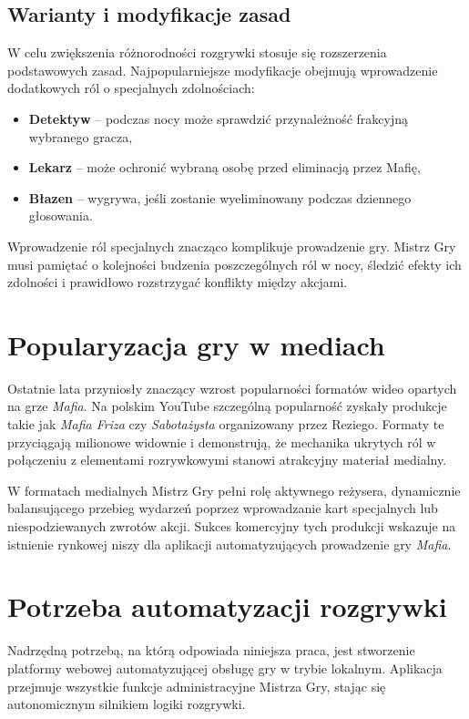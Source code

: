 ﻿\documentclass[a4paper,twoside,11pt]{mwrep}
\theoremstyle{plain} \newtheorem{thm}{Twierdzenie}
\theoremstyle{plain} \newtheorem{lem}{Lemat}
\theoremstyle{definition} \newtheorem{defn}{Definicja}
\theoremstyle{remark} \newtheorem*{rem}{Wniosek}
\begin{document}
\subsection{Warianty i modyfikacje zasad}

W celu zwiększenia różnorodności rozgrywki stosuje się rozszerzenia podstawowych zasad. Najpopularniejsze modyfikacje obejmują wprowadzenie dodatkowych ról o specjalnych zdolnościach:

\begin{itemize}
    \item \textbf{Detektyw} -- podczas nocy może sprawdzić przynależność frakcyjną wybranego gracza,
    \item \textbf{Lekarz} -- może ochronić wybraną osobę przed eliminacją przez Mafię,
    \item \textbf{Błazen} -- wygrywa, jeśli zostanie wyeliminowany podczas dziennego głosowania.
\end{itemize}

Wprowadzenie ról specjalnych znacząco komplikuje prowadzenie gry. Mistrz Gry musi pamiętać o kolejności budzenia poszczególnych ról w nocy, śledzić efekty ich zdolności i prawidłowo rozstrzygać konflikty między akcjami.

\section{Popularyzacja gry w mediach}

Ostatnie lata przyniosły znaczący wzrost popularności formatów wideo opartych na grze \textit{Mafia}. Na polskim YouTube szczególną popularność zyskały produkcje takie jak \textit{Mafia Friza} czy \textit{Sabotażysta} organizowany przez Reziego. Formaty te przyciągają milionowe widownie i demonstrują, że mechanika ukrytych ról w połączeniu z elementami rozrywkowymi stanowi atrakcyjny materiał medialny.

W formatach medialnych Mistrz Gry pełni rolę aktywnego reżysera, dynamicznie balansującego przebieg wydarzeń poprzez wprowadzanie kart specjalnych lub niespodziewanych zwrotów akcji. Sukces komercyjny tych produkcji wskazuje na istnienie rynkowej niszy dla aplikacji automatyzujących prowadzenie gry \textit{Mafia}.
\section{Potrzeba automatyzacji rozgrywki}

Nadrzędną potrzebą, na którą odpowiada niniejsza praca, jest stworzenie platformy webowej automatyzującej obsługę gry w trybie lokalnym. Aplikacja przejmuje wszystkie funkcje administracyjne Mistrza Gry, stając się autonomicznym silnikiem logiki rozgrywki.
\end{document}
